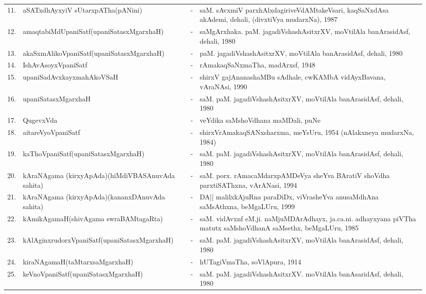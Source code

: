 {\begin{longtable}{rp{6cm}cp{9cm}<{\raggedright}}
11. & aSATxdhAyxyiV sUtarxpATha\newline (pANini) &-& saM. sAvxmiV parxhAlxdagiriveVdAMtakeVsari, kaqSaNxdAsa akAdemi, dehali, (divxtiVya mudarxNa), 1987\\
12. & amaqtabiMdUpaniSatf\newline (upaniSatasxMgarxhaH) &-& saMgArxhaka. paM. jagadiVshashAsitxrXV, moVtilAla banArasidAsf, dehali, 1980\\
13. & akaSxmAlikoVpaniSatf\newline (upaniSatasxMgarxhaH) &-& paM. jagadiVshashAsitxrXV, moVtilAla banArasidAsf, dehali, 1980\\
14. & IshAvAsoyxVpaniSatf &-& rAmakaqSaNxmaTha, madArxsf, 1948\\
15. & upaniSadAvxkayxmahAkoVSaH &-& shirxV gajAnanashaMBu sAdhale, cwKAMbA vidAyxBavana, vAraNAsi, 1990\\
16. & upaniSatasxMgarxhaH &-& saM. paM. jagadiVshashAsitxrXV, moVtilAla banArasidAsf, dehali, 1980\\
17. & QugevxVda &-& veYdika saMshoVdhana maMDali, puNe\\
18. & aitareVyoVpaniSatf &-& shirxVrAmakaqSANxsharxma, meYsUru, 1954 (nAlakxneya mudarxNa, 1984)\\
19. & kaThoVpaniSatf\newline (upaniSatasxMgarxhaH) &-& saM. paM. jagadiVshashAsitxrXV, moVtilAla banArasidAsf, dehali, 1980\\
20. & kAraNAgama (kirxyApAda)\newline (hiMdiVBASAnuvAda sahita) &-& saM. porx. rAmacaMdarxpAMDeVya sheYva BAratiV shoVdha parxtiSAThxna, vArANasi, 1994\\
21. & kAraNAgama (kirxyApAda)\newline (kananxDAnuvAda sahita) &-& DA|| malilxkAjuRna paraDiDx, viVrasheYva anusaMdhAna saMsAthxna, beMgaLUru, 1999\\
22. & kAmikAgamaH\newline (shivAgama swraBAMtagaRta) &-& saM. vidAvxnf eM.ji. naMjuMDArAdhayx, ja.ca.ni. adhayxyana piVTha matutx saMshoVdhanA saMsethx, beMgaLUru, 1985\\
23. & kAlAginxrudorxVpaniSatf\newline (upaniSatasxMgarxhaH) &-& saM. paM. jagadiVshashAsitxrXV, moVtilAla banArasidAsf, dehali, 1980\\
24. & kiraNAgamaH\newline (taMtarxsaMgarxhaH) &-& hUTagiVmaTha, soVlApura, 1914\\
25. & keVnoVpaniSatf\newline (upaniSatasxMgarxhaH) &-& saM. paM. jagadiVshashAsitxrXV. moVtilAla banAsaridAsf, dehali, 1980\\

\end{longtable}}
